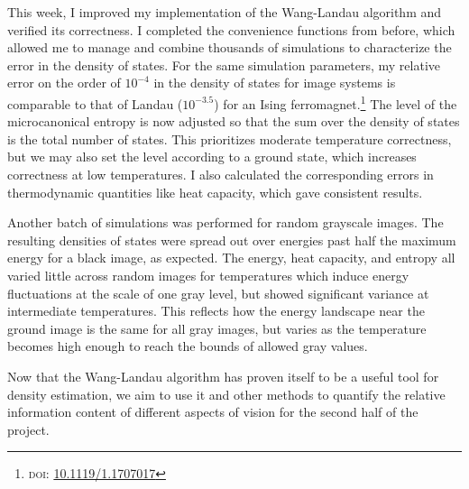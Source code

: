 \documentclass[../notebook.tex]{subfiles}
\begin{document}
\label{sec:sum4}

This week, I improved my implementation of the Wang-Landau algorithm and
verified its correctness. I completed the convenience functions from before,
which allowed me to manage and combine thousands of simulations to characterize
the error in the density of states. For the same simulation parameters, my
relative error on the order of $10^{-4}$ in the density of states for image
systems is comparable to that of Landau ($10^{-3.5}$) for an Ising
ferromagnet.\footnote{\textsc{doi}:
\href{https://doi.org/10.1119/1.1707017}{10.1119/1.1707017}}
The level of the microcanonical entropy is now adjusted so that the sum over the
density of states is the total number of states. This prioritizes moderate
temperature correctness, but we may also set the level according to a ground
state, which increases correctness at low temperatures. I also calculated the
corresponding errors in thermodynamic quantities like heat capacity, which gave
consistent results.

Another batch of simulations was performed for random grayscale images. The
resulting densities of states were spread out over energies past half the
maximum energy for a black image, as expected. The energy, heat capacity, and
entropy all varied little across random images for temperatures which induce
energy fluctuations at the scale of one gray level, but showed significant
variance at intermediate temperatures. This reflects how the energy landscape
near the ground image is the same for all gray images, but varies as the
temperature becomes high enough to reach the bounds of allowed gray values.

Now that the Wang-Landau algorithm has proven itself to be a useful tool for
density estimation, we aim to use it and other methods to quantify the relative
information content of different aspects of vision for the second half of the
project.
\end{document}
